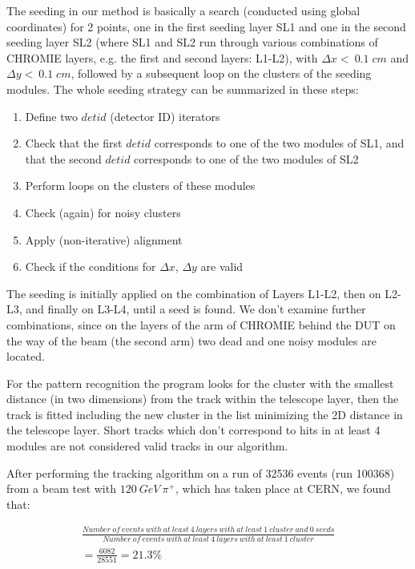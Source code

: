 \documentclass[a4paper,11pt]{article}
\begin{document}
The seeding in our method is basically a search (conducted using global coordinates) for 2 points, one in the first seeding layer SL1 and one in the second seeding layer SL2 (where SL1 and SL2 run through various combinations of CHROMIE layers, e.g. the first and second layers: L1-L2), with $\Delta x <\: 0.1{\;} cm$ and $\Delta y <\: 0.1{\;} cm$, followed by a subsequent loop on the clusters of the seeding modules. The whole seeding strategy can be summarized in these steps:

\begin{enumerate}
	\item Define two $detid$ (detector ID) iterators
	\item Check that the first $detid$ corresponds to one of the two modules of SL1, and that the second $detid$ corresponds to one of the two modules of SL2
	\item Perform loops on the clusters of these modules
	\item Check (again) for noisy clusters
	\item Apply (non-iterative) alignment
	\item Check if the conditions for $\Delta x$, $\Delta y$ are valid
\end{enumerate}

The seeding is initially applied on the combination of Layers L1-L2, then on L2-L3, and finally on L3-L4, until a seed is found. We don't examine further combinations, since on the layers of the arm of CHROMIE behind the DUT on the way of the beam (the second arm) two dead and one noisy modules are located.

For the pattern recognition the program looks for the cluster with the smallest distance (in two dimensions) from the track within the telescope layer, then the track is fitted including the new cluster in the list minimizing the 2D distance in the telescope layer. Short tracks which don't correspond to hits in at least 4 modules are not considered valid tracks in our algorithm.

After performing the tracking algorithm on a run of 32536 events (run 100368) from a beam test with $120\: GeV\: \pi^{+}$, which has taken place at CERN, we found that:

\begin{equation}
\label{eq:1}
\begin{split}
\frac{Number\: of\: events\: with\: at\: least\: 4\: layers\: with\: at\: least\: 1\: cluster\: and\: 0\:seeds}{Number\: of\: events\: with\: at\: least\: 4\: layers\: with\: at\: least\: 1\: cluster}
\\= \frac{6082}{28551} = 21.3 \%  \
\end{split}
\end{equation}
\end{document}
